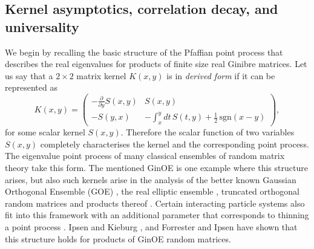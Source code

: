 \documentclass[11pt,reqno]{amsproc}
\numberwithin{equation}{section}
\numberwithin{theorem}{section}
\begin{document}
\subsection{Kernel asymptotics, correlation decay, and universality}
\label{se:kernasympt}
We begin by recalling the basic structure of the Pfaffian point process that describes the real eigenvalues for products of finite size real Ginibre matrices. Let us say that a $2 \times 2$ matrix kernel $K(x,y)$ is in \textit{derived form} if it can be represented as
\begin{equation}
K(x,y) = \begin{pmatrix} -\frac{\partial}{\partial y}S(x,y) & S(x,y)\\ -S(y,x) & -\int_{x}^{y}dt\,S(t,y)+\frac{1}{2}\,\mathrm{sgn}(x-y) 
\end{pmatrix},\label{derivform}
\end{equation}
for some scalar kernel $S(x,y)$. Therefore the scalar function of two variables $S(x,y)$ completely characterises the kernel and the corresponding point process. The eigenvalue point process of many classical ensembles of random matrix theory take this form. The mentioned GinOE is one example where this structure arises, but also such kernels arise in the analysis of the better known Gaussian Orthogonal Ensemble (GOE) \cite{Meh04}, the real elliptic ensemble \cite{FN08}, truncated orthogonal random matrices \cite{KSZ10} and products thereof \cite{IK14,FIK20}. Certain interacting particle systems also fit into this framework with an additional parameter that corresponds to thinning 
a point process \cite{TZ11,GPTZ18, GTZ20}. Ipsen and Kieburg \cite{IK14}, and Forrester and Ipsen \cite{FI16} have shown that this structure holds for products of GinOE random matrices.
\end{document}
